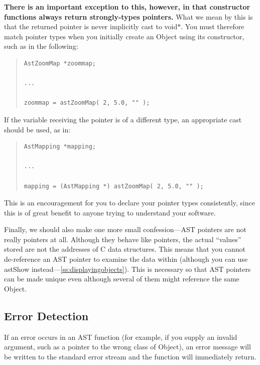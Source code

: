 \documentclass[twoside,11pt]{article}
\newcommand{\htmlref}[2]{#1}
\newcommand{\secref}[1]{\S\ref{#1}}
\renewcommand{\secref}[1]{\ref{#1}}
\begin{document}
{\bf{There is an important exception to this, however, in that
constructor functions always return strongly-types pointers.}}  What
we mean by this is that the returned pointer is never implicitly cast
to void$*$. You must therefore match pointer types when you initially
create an Object using its constructor, such as in the following:

\begin{quote}
\small
\begin{verbatim}
AstZoomMap *zoommap;

...

zoommap = astZoomMap( 2, 5.0, "" );
\end{verbatim}
\normalsize
\end{quote}

If the variable receiving the pointer is of a different type, an
appropriate cast should be used, as in:

\begin{quote}
\small
\begin{verbatim}
AstMapping *mapping;

...

mapping = (AstMapping *) astZoomMap( 2, 5.0, "" );
\end{verbatim}
\normalsize
\end{quote}

This is an encouragement for you to declare your pointer types
consistently, since this is of great benefit to anyone trying to
understand your software.

Finally, we should also make one more small confession---AST pointers
are not really pointers at all.  Although they behave like pointers,
the actual ``values'' stored are not the addresses of C data
structures. This means that you cannot de-reference an AST pointer to
examine the data within (although you can use astShow
instead---\secref{ss:displayingobjects}). This is necessary so that AST
pointers can be made unique even although several of them might
reference the same Object.

\subsection{\label{ss:errordetection}Error Detection}

If an error occurs in an AST function (for example, if you supply an
invalid argument, such as a pointer to the wrong class of \htmlref{Object}{Object}), an
error message will be written to the standard error stream and the
function will immediately return.
\end{document}

